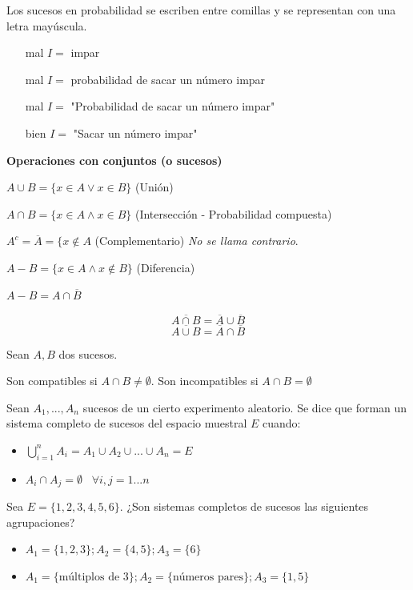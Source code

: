 
Los sucesos en probabilidad se escriben entre comillas y se representan con una letra mayúscula.

\begin{itemize}
    \item[mal] $I =$ impar
    \item[mal] $I =$ probabilidad de sacar un número impar
    \item[mal] $I =$ "Probabilidad de sacar un número impar"
    \item[bien] $I =$ "Sacar un número impar"
\end{itemize}

\textbf{Operaciones con conjuntos (o sucesos)}

$A\cup B = \{x\in A \vee x \in B\}$ (Unión)

$A\cap B = \{x\in A \wedge x \in B\}$ (Intersección - Probabilidad compuesta)

$A^c = \overline{A} = \{x\not\in A$ (Complementario) \textit{No se llama contrario}.

$A - B = \{x\in A \wedge x \not\in B\}$ (Diferencia)

\obs $A - B = A \cap \overline{B}$

\begin{defn}
\[\overline{A\cap B} = \overline{A}\cup \overline{B}\]
\[\overline{A\cup B} = \overline{A}\cap \overline{B}\]
\end{defn}



\begin{defn}[Compatibilidad]
Sean $A,B$ dos sucesos.

Son compatibles si $A\cap B \not= \emptyset$. 
Son incompatibles si $A\cap B =\emptyset$
\end{defn}

\begin{defn}
Sean $A_1,...,A_n$ sucesos de un cierto experimento aleatorio.
%
Se dice que forman un sistema completo de sucesos del espacio muestral $E$ cuando:

\begin{itemize}
    \item $\displaystyle\bigcup_{i=1}^n A_i = A_1\cup A_2 \cup ... \cup A_n =  E$
    \item $A_i\cap A_j = \emptyset\;\;\; \forall i,j=1...n$
\end{itemize}
\end{defn}

\begin{example}
Sea $E = \{1,2,3,4,5,6\}$. ¿Son sistemas completos de sucesos las siguientes agrupaciones?

\begin{itemize}
    \item $A_1 = \{1,2,3\}; A_2 = \{4,5\} ; A_3 = \{6\}$
    \item $A_1 = \{\text{múltiplos de 3}\} ; A_2 = \{\text{números pares}\} ; A_3 = \{1,5\}$
\end{itemize}
\end{example}


